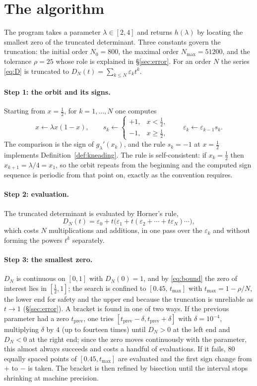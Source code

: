 \documentclass[11pt]{article}
\theoremstyle{plain}
\theoremstyle{definition}
\newcommand{\eps}{\varepsilon}
\begin{document}
\section{The algorithm}\label{sec:algo}

The program takes a parameter $\lambda\in[2,4]$ and returns $h(\lambda)$ by locating the
smallest zero of the truncated determinant.  Three constants govern the truncation: the
initial order $N_0=800$, the maximal order $N_{\max}=51200$, and the tolerance $\rho=25$
whose role is explained in \S\ref{sec:error}.  For an order $N$ the series \eqref{eq:D} is
truncated to
$D_N(t)=\sum_{k\le N}\eps_k t^k$.

\paragraph{Step 1: the orbit and its signs.}
Starting from $x=\tfrac12$, for $k=1,\dots,N$ one computes
\[
  x\longleftarrow\lambda x(1-x),\qquad
  s_k\longleftarrow\begin{cases}+1,&x<\tfrac12,\\ -1,&x\ge\tfrac12,\end{cases}
  \qquad\eps_k\longleftarrow\eps_{k-1}s_k .
\]
The comparison is the sign of $g_\lambda'(x_k)$, and the rule $s_k=-1$ at $x=\tfrac12$
implements Definition~\ref{def:kneading}.  The rule is self-consistent: if $x_k=\tfrac12$
then $x_{k+1}=\lambda/4=x_1$, so the orbit repeats from the beginning and the computed sign
sequence is periodic from that point on, exactly as the convention requires.

\paragraph{Step 2: evaluation.}
The truncated determinant is evaluated by Horner's rule,
\[
  D_N(t)=\eps_0+t\bigl(\eps_1+t(\eps_2+\cdots+t\eps_N)\cdots\bigr),
\]
which costs $N$ multiplications and additions, in one pass over the $\eps_k$ and without
forming the powers $t^k$ separately.

\paragraph{Step 3: the smallest zero.}
$D_N$ is continuous on $[0,1]$ with $D_N(0)=1$, and by \eqref{eq:bound} the zero of
interest lies in $[\tfrac12,1]$; the search is confined to $[0.45,\,t_{\max}]$ with
$t_{\max}=1-\rho/N$, the lower end for safety and the upper end because the truncation is
unreliable as $t\to1$ (\S\ref{sec:error}).  A bracket is found in one of two ways.  If the
previous parameter had a zero $t_{\mathrm{prev}}$, one tries
$[t_{\mathrm{prev}}-\delta,t_{\mathrm{prev}}+\delta]$ with $\delta=10^{-4}$, multiplying
$\delta$ by $4$ (up to fourteen times) until $D_N>0$ at the left end and $D_N<0$ at the
right end; since the zero moves continuously with the parameter, this almost always
succeeds and costs a handful of evaluations.  If it fails, $80$ equally spaced points of
$[0.45,t_{\max}]$ are evaluated and the first sign change from $+$ to $-$ is taken.  The
bracket is then refined by bisection until the interval stops shrinking at machine
precision.
\end{document}

